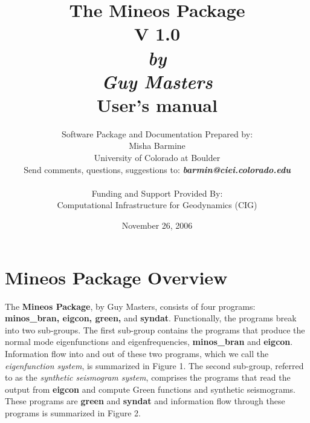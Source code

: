 \documentclass[11pt]{article}
\renewcommand{\baselinestretch}{1.2}
\begin{document}
\vspace{30pt}

\title{\vspace{20pt}
{\bf \Huge The Mineos Package}\\
{\bf V 1.0}  \\
{\bf \emph{by}} \\
{\bf \emph{Guy Masters}} \\
\vspace{25pt}
{\bf User's manual} \\
\vspace{42pt}
\vspace{100pt}
\vspace{100pt}
}
\author{
Software Package and Documentation Prepared by:\\
Misha Barmine\\
University of Colorado at Boulder\\
Send comments, questions, suggestions to:
\textbf{\emph{barmin@ciei.colorado.edu}}  \\ \\
\large Funding and Support Provided By: \\
\large Computational Infrastructure for Geodynamics (CIG)\\ \normalsize}

\date {{November 26, 2006}}

\maketitle


\newpage

\renewcommand{\baselinestretch}{1.0}
\tableofcontents
\renewcommand{\baselinestretch}{1.2}

\newpage

\section{Mineos Package Overview}

The {\bf Mineos Package}, by Guy Masters, consists of four programs:
{\bf minos\_bran, eigcon, green,} and {\bf syndat}. Functionally,
the programs break into two sub-groups. The first sub-group contains
the programs that produce the normal mode eigenfunctions and eigenfrequencies,
{\bf minos\_bran} and {\bf eigcon}. Information flow into and out of these
two programs, which we call the {\it eigenfunction system},
is summarized in Figure 1. The second sub-group, referred to as the
{\it synthetic seismogram system}, comprises
the programs that read the output from {\bf eigcon} and compute Green
functions and synthetic seismograms. These programs are {\bf green}
and {\bf syndat} and information flow through these programs is
summarized in Figure 2.
\end{document}
